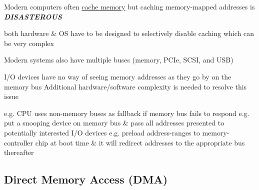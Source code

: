 \begin{itemize}
          \begin{itemize}

              \vItem
                    Modern computers often \ul{cache
                    memory} but caching memory-mapped addresses is
                    \textbf{ \textit{DISASTEROUS}}

                    \begin{itemize}

                        \vItem
                              both hardware \& OS have to be designed to selectively disable
                              caching which can be very complex
                    \end{itemize}
              \vItem
                    Modern systems also have multiple buses (memory, PCIe, SCSI, and
                    USB)

                    \begin{itemize}

                        \vItem
                              I/O devices have no way of seeing memory addresses as they go by
                              on the memory bus
                        \vItem
                              Additional hardware/software complexity is needed to resolve this
                              issue

                              \begin{itemize}

                                  \vItem
                                        e.g. CPU uses non-memory buses as fallback if memory bus fails
                                        to respond
                                  \vItem
                                        e.g. put a snooping device on memory bus \& pass all addresses
                                        presented to potentially interested I/O devices
                                  \vItem
                                        e.g. preload address-ranges to memory-controller chip at boot
                                        time \& it will redirect addresses to the appropriate bus
                                        thereafter
                              \end{itemize}
                    \end{itemize}
          \end{itemize}
\end{itemize}

\subsection*{Direct Memory Access (DMA)}

